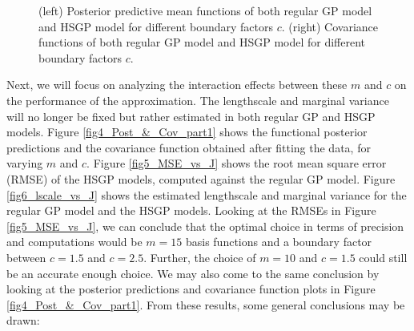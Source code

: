 \documentclass[]{interact}
\theoremstyle{plain}%
\theoremstyle{definition}
\theoremstyle{remark}
\begin{document}
\begin{figure}
\caption{(left) Posterior predictive mean functions of both regular GP model and HSGP model for different boundary factors $c$. (right) Covariance functions of both regular GP model and HSGP model for different boundary factors $c$.}
  \label{fig2_Post_L}
\end{figure}


Next, we will focus on analyzing the interaction effects between these $m$ and $c$ on the performance of the approximation. The lengthscale and marginal variance will no longer be fixed but rather estimated in both regular GP and HSGP models. Figure \ref{fig4_Post_&_Cov_part1} shows the functional posterior predictions and the covariance function obtained after fitting the data, for varying $m$ and $c$. Figure \ref{fig5_MSE_vs_J} shows the root mean square error (RMSE) of the HSGP models, computed against the regular GP model. Figure \ref{fig6_lscale_vs_J} shows the estimated lengthscale and marginal variance for the regular GP model and the HSGP models. Looking at the RMSEs in Figure \ref{fig5_MSE_vs_J}, we can conclude that the optimal choice in terms of precision and computations would be $m = 15$ basis functions and a boundary factor between $c = 1.5$ and $c = 2.5$. Further, the choice of $m = 10$ and $c = 1.5$ could still be an accurate enough choice. We may also come to the same conclusion by looking at the posterior predictions and covariance function plots in Figure \ref{fig4_Post_&_Cov_part1}. From these results, some general conclusions may be drawn:
\end{document}

